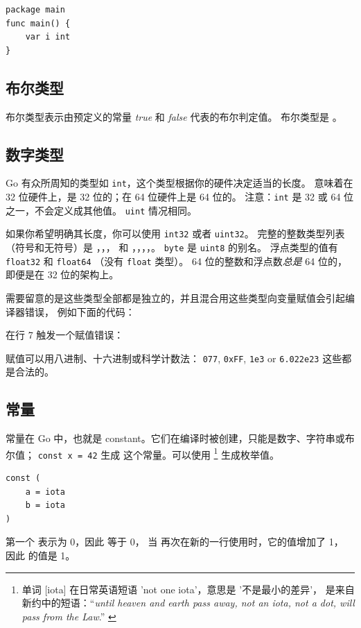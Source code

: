 \begin{lstlisting}
package main
func main() { 
    var i int
}
\end{lstlisting}

\subsection{布尔类型}
布尔类型表示由预定义的常量 \emph{true} 和 \emph{false} 代表的布尔判定值。
布尔类型是 。

\subsection{数字类型}
Go 有众所周知的类型如 \lstinline{int}，这个类型根据你的硬件决定适当的长度。
意味着在 32 位硬件上，是 32 位的；在 64 位硬件上是 64 位的。
注意：\lstinline{int} 是 32 或 64 位之一，不会定义成其他值。
\lstinline{uint} 情况相同。

如果你希望明确其长度，你可以使用 \lstinline{int32} 或者 \lstinline{uint32}。
完整的整数类型列表（符号和无符号）是 
，，， 和
，，，，。
\lstinline{byte} 是 \lstinline{uint8} 的别名。
浮点类型的值有 \lstinline{float32} 和 \lstinline{float64}
（没有 \lstinline{float} 类型）。 
64 位的整数和浮点数\emph{总是} 64 位的，即便是在 32 位的架构上。

需要留意的是这些类型全部都是独立的，并且混合用这些类型向变量赋值会引起编译器错误，
例如下面的代码：

在行 7 触发一个赋值错误：

\noindent{}

赋值可以用八进制、十六进制或科学计数法：
\lstinline{077}, \lstinline{0xFF}, \lstinline{1e3} or
\mbox{\lstinline{6.022e23}} 这些都是合法的。

\subsection{常量}
\label{sec:constants}
常量在 Go 中，也就是 constant。它们在编译时被创建，只能是数字、字符串或布尔值；
\lstinline{const x = 42} 生成  这个常量。可以使用 
\footnote{单词 [iota] 在日常英语短语 'not one iota'，意思是 '不是最小的差异'，
是来自新约中的短语：``\emph{until heaven and earth pass away, not an
iota, not a dot, will pass from the Law}.'' \cite{iota}}
生成枚举值。
\begin{lstlisting}
const (
	a = iota
	b = iota 
)
\end{lstlisting}
第一个  表示为 0，因此  等于 0，
当  再次在新的一行使用时，它的值增加了 1，
因此  的值是 1。


